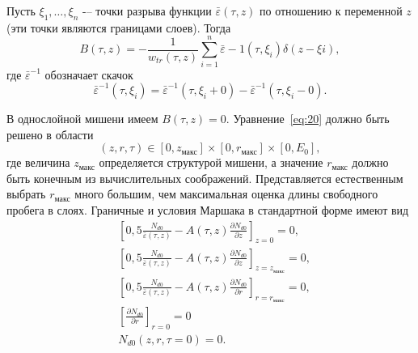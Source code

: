 Пусть \(\xi_1,\ldots,\xi_n\) -– точки разрыва функции \(\bar{\varepsilon}(\tau , z)\) по отношению к переменной \( z \) (эти точки являются границами слоев). Тогда
\begin{equation}
B(\tau, z) = −\frac{1}{w_{tr}(\tau, z)}\sum_{i=1}^{n} \bar{\varepsilon} −1 (\tau ,\xi_i ) \delta ( z − \xi i ) ,    
\end{equation}
где \(\bar{\varepsilon}^{−1}\) обозначает скачок
\begin{equation}
    \bar{\varepsilon}^{−1} (\tau ,\xi_i ) = \bar{\varepsilon}^{−1} (\tau,\xi_i + 0 ) − \bar{\varepsilon}^{−1} (\tau ,\xi_i − 0 ).
\end{equation}

В однослойной мишени имеем \( B(\tau,z)=0 \).
Уравнение~\ref{eq:20} должно быть решено в области
\begin{equation}
    (z, r,\tau) \in [0, z_\text{макс}]\times [0, r_\text{макс} ]\times[0, E_0],    
\end{equation}
где величина \( z_\text{макс} \) определяется структурой мишени, а значение \( r_\text{макс} \) должно быть
конечным из вычислительных соображений. Представляется естественным выбрать \( r_\text{макс} \)
много большим, чем максимальная оценка длины свободного пробега в слоях.
Граничные и условия Маршака в стандартной форме \cite{keiz} имеют вид
\begin{align}
& \left[0,5 \frac{N_{d0}}{\bar{\varepsilon}(\tau, z)} − A (\tau , z)\frac{\partial N_{d0}}{\partial z}\right]_{z=0} = 0 ,\\
& \left[0,5 \frac{N_{d0}}{\bar{\varepsilon}(\tau, z)} − A (\tau , z)\frac{\partial N_{d0}}{\partial z}\right]_{z=z_\text{макс}} = 0 ,\\
& \left[0,5 \frac{N_{d0}}{\bar{\varepsilon}(\tau, z)} − A (\tau , z)\frac{\partial N_{d0}}{\partial r}\right]_{r=r_\text{макс}} = 0,\\
& \left[\frac{\partial N_{d0}}{\partial r}\right]_{r=0} = 0\\
& N_{d0}(z, r, \tau=0 ) = 0.
\end{align}
